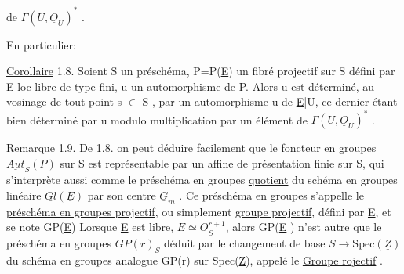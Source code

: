 
de $\Gamma(U,\underline{O}_U)^*$ .

En particulier:

\uline{Corollaire} 1.8. Soient S un préschéma, P=P(\underline{E}) un fibré projectif sur S
défini par \underline{E} loc libre de type fini, u un automorphisme de P. Alors u
est déterminé, au vosinage de tout point s $\in$ S , par un automorphisme
u de \underline{E}|U, ce dernier étant bien déterminé par u modulo multiplication par
un élément de $\Gamma(U,\underline{O}_U)^*$ .

\uline{Remarque} 1.9. De 1.8. on  peut déduire facilement que le foncteur 
 en groupes $\underline{Aut}_S(P)$ sur S est représentable par un  affine
de présentation finie sur S, qui s'interprète aussi comme le préschéma en
groupes \uline{quotient} du schéma en groupes linéaire $\underline{Gl}(\underline{E})$ par son centre
$\underline{G}_m$ . Ce préschéma en groupes s'appelle 
le \uline{préschéma en groupes projectif}, ou simplement \uline{groupe projectif}, défini
par \underline{E}, et se note GP(\underline{E})\hand{,} Lorsque \underline{E} est libre, $\underline{E}\simeq\underline{O}_S^{r+1}$, alors GP(\underline{E} ) n'est autre que le
 préschéma en groupes $GP(r)_S$ déduit par le changement de base
$S\to\mathrm{Spec}(\underline{Z})$  du schéma en groupes analogue GP(r) sur Spec(\underline{Z}), appelé
le \uline{Groupe rojectif} .

